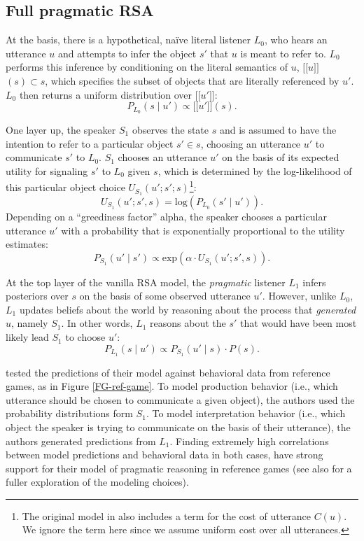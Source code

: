 \documentclass[10pt,a4paper]{article}
\newcommand{\sem}[1]{\mbox{$[\![$#1$]\!]$}}
\begin{document}
\subsection{Full pragmatic RSA}



At the basis, there is a hypothetical, na\"ive literal listener $L_0$, who hears an utterance $u$ and attempts to infer the object $s'$ that $u$ is meant to refer to.
$L_0$ performs this inference by conditioning on the literal semantics of $u$, \sem{$u$}$(s)\subset s$, which specifies the subset of objects that are literally referenced by $u'$. 
$L_0$ then returns a uniform distribution over \sem{$u'$}:
$$P_{L_{0}}(s\mid u') \propto \sem{$u'$}(s).$$

One layer up, the speaker $S_1$ observes the state $s$ and is assumed to have the intention to refer to a particular object $s' \in s$, choosing an utterance $u'$ to communicate $s'$ to $L_0$.
$S_1$ chooses an utterance $u'$ on the basis of its expected utility for signaling $s'$ to $L_0$ given $s$, which is determined by the log-likelihood of this particular object choice $U_{S_1}(u';s';s)$\footnote{The original model in  also includes a term for the cost of utterance $C(u)$. We ignore the term here since we assume uniform cost over all utterances.}:
$$U_{S_{1}}(u';s',s) = \textrm{log}(P_{L_{0}}(s' \mid u')).$$ 
Depending on a ``greediness factor'' alpha, the speaker chooses a particular utterance $u'$ with a probability that is exponentially proportional to the utility estimates: 
$$P_{S_{1}} (u' \mid s') \propto   \textrm{exp}(\alpha \cdot U_{S_{1}} (u';s',s)).$$

At the top layer of the vanilla RSA model, the \emph{pragmatic} listener $L_1$ infers posteriors over $s$ on the basis of some observed utterance $u'$.
However, unlike $L_0$, $L_1$ updates beliefs about the world by reasoning about the process that \emph{generated} $u$, namely $S_1$.
In other words, $L_1$ reasons about the $s'$ that would have been most likely lead $S_1$ to choose $u'$:
$$P_{L_{1}}(s\mid u') \propto P_{S_{1}}(u' \mid s) \cdot P(s).$$

 tested the predictions of their model against behavioral data from reference games, as in Figure \ref{FG-ref-game}.
To model production behavior (i.e., which utterance should be chosen to communicate a given object), the authors used the probability distributions form $S_1$.
To model interpretation behavior (i.e., which object the speaker is trying to communicate on the basis of their utterance), the authors generated predictions from $L_1$.
Finding extremely high correlations between model predictions and behavioral data in both cases, \citeauthor{frankgoodman2012} have strong support for their model of pragmatic reasoning in reference games (see also  for a fuller exploration of the modeling choices).
\end{document}
